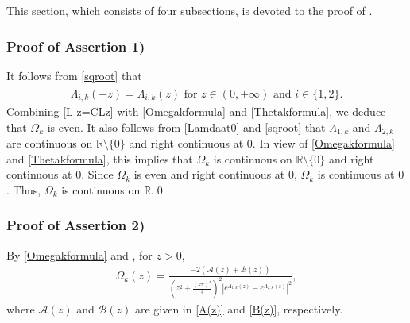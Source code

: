 \documentclass[11pt, reqno]{amsart}
\theoremstyle{plain}
\numberwithin{equation}{section}
\newcommand{\mR}{\mathbb{R}}
\begin{document}
This section, which consists of four subsections, is devoted to the proof of .
\subsubsection{Proof of Assertion 1)} \label{sect-as-behavior-p1}
It follows from \eqref{sqroot} that
\begin{align}	\label{L-z=CLz}
    \Lambda_{i, k} \left(-z \right) = \overline{\Lambda_{i, k}\left(z \right)}   \mbox{ for } z \in (0, +\infty) \text{ and } i \in \{1, 2\}. 
\end{align}
Combining \eqref{L-z=CLz} with \eqref{Omegakformula} and \eqref{Thetakformula}, we deduce that $\Omega_k$ is even. It also follows from \eqref{Lamdaat0} and \eqref{sqroot} that $\Lambda_{1,k}$ and $\Lambda_{2,k}$ are continuous on $\mR \setminus \{0\}$ and right continuous at $0$. In view of  \eqref{Omegakformula} and \eqref{Thetakformula}, this implies that $\Omega_k$ is continuous on $\mR \setminus \{0\}$ and right continuous at $0$. Since $\Omega_k$ is even and right continuous at $0$, $\Omega_k$ is continuous at $0$. Thus, $\Omega_k$ is continuous on $\mR$.\qed



\subsubsection{Proof of Assertion 2)} \label{sect-as-behavior-p2}
 By \eqref{Omegakformula} and , for $z > 0$, 
\begin{align}
   \Omega_k(z)  = \frac{-2 \left(\mathcal{A}(z) + \mathcal{B}(z) \right)}{\left(z^2 + \frac{(k \pi)^4}{4} \right)^2 \left|e^{\Lambda_{1,k}(z)} - e^{\Lambda_{2,k}(z)} \right|^2},	\label{asym1}
\end{align}
where $\mathcal{A}(z)$ and $\mathcal{B}(z)$ are given in \eqref{A(z)} and \eqref{B(z)}, respectively. 
\end{document}

